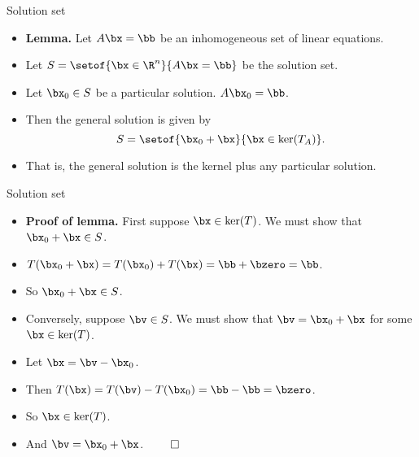 \documentclass{beamer}
\begin{document}
\begin{frame}{Solution set}

\begin{itemize}
\item \textbf{Lemma.} Let $A\bx=\bb$ be an inhomogeneous set of linear equations.
\item Let $S=\setof{\bx \in \R^n}{A \bx = \bb}$ be the solution set.
\item Let $\bx_0\in S$ be a particular solution. $A\bx_0=\bb$.
\item Then the general solution is given by
$$S=\setof{\bx_0 + \bx}{\bx\in\ker(T_A)}.$$
\item That is, the general solution is the kernel plus any particular solution.
\end{itemize}

\end{frame}


\begin{frame}{Solution set}

\begin{itemize}
\item \textbf{Proof of lemma.} First suppose $\bx\in\ker(T)$. We must show
that $\bx_0 + \bx \in S$.
\item $T(\bx_0+\bx) = T(\bx_0) + T(\bx) = \bb + \bzero = \bb$.
\item So $\bx_0+\bx\in S$.
\item Conversely, suppose $\bv \in S$. We must show that $\bv = \bx_0 + \bx$
for some $\bx\in\ker(T)$.
\item Let $\bx = \bv - \bx_0$.
\item Then $T(\bx) = T(\bv) - T(\bx_0) = \bb - \bb = \bzero$.
\item So $\bx\in\ker(T)$.
\item And $\bv = \bx_0 + \bx$. $\qed$
\end{itemize}

\end{frame}

\end{document}
